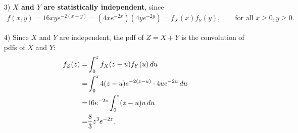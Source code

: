 \documentclass{assignment}
\begin{document}
\begin{sol}
\begin{itemize}
\begin{align}
        \end{align}
        \item[3)] \textbf{$X$ and $Y$ are statistically independent}, since
        \begin{align}
            f(x,y)=16xye^{-2(x+y)}=\left(4xe^{-2x}\right)\left(4ye^{-2y}\right)=f_X(x)f_Y(y),\qquad\text{for all }x\geq 0,y\geq 0.
        \end{align}
        \item[4)] Since $X$ and $Y$ are independent, the pdf of $Z=X+Y$ is the convolution of pdfs of $X$ and $Y$:
        \begin{align}
            \notag f_Z(z)=&\int_0^zf_X(z-u)f_Y(u)\,du\\
            \notag=&\int_0^z4(z-u)e^{-2(z-u)}\cdot 4ue^{-2u}\,du\\
            \notag=&16e^{-2z}\int_0^z(z-u)u\,du\\
            =&\frac{8}{3}z^3e^{-2z}.
        \end{align}
    \end{itemize}
\end{sol}
\end{document}
